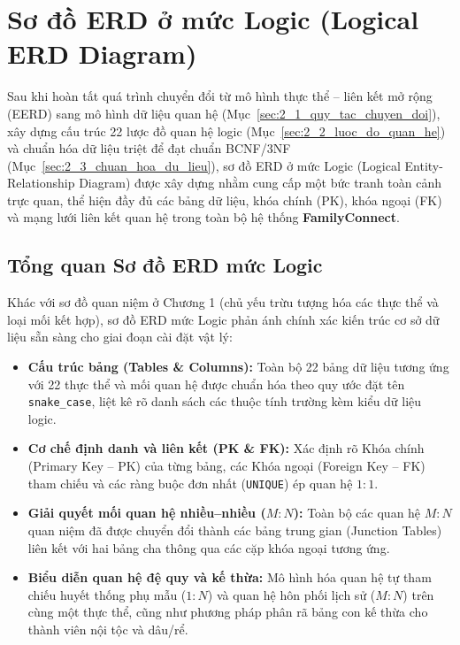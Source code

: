 \section{Sơ đồ ERD ở mức Logic (Logical ERD Diagram)}
\label{sec:2_4_so_do_erd_logic}

Sau khi hoàn tất quá trình chuyển đổi từ mô hình thực thể -- liên kết mở rộng (EERD) sang mô hình dữ liệu quan hệ (Mục~\ref{sec:2_1_quy_tac_chuyen_doi}), xây dựng cấu trúc 22 lược đồ quan hệ logic (Mục~\ref{sec:2_2_luoc_do_quan_he}) và chuẩn hóa dữ liệu triệt để đạt chuẩn BCNF/3NF (Mục~\ref{sec:2_3_chuan_hoa_du_lieu}), sơ đồ ERD ở mức Logic (Logical Entity-Relationship Diagram) được xây dựng nhằm cung cấp một bức tranh toàn cảnh trực quan, thể hiện đầy đủ các bảng dữ liệu, khóa chính (PK), khóa ngoại (FK) và mạng lưới liên kết quan hệ trong toàn bộ hệ thống \textbf{FamilyConnect}.

\subsection{Tổng quan Sơ đồ ERD mức Logic}

Khác với sơ đồ quan niệm ở Chương 1 (chủ yếu trừu tượng hóa các thực thể và loại mối kết hợp), sơ đồ ERD mức Logic phản ánh chính xác kiến trúc cơ sở dữ liệu sẵn sàng cho giai đoạn cài đặt vật lý:
\begin{itemize}
    \item \textbf{Cấu trúc bảng (Tables \& Columns):} Toàn bộ 22 bảng dữ liệu tương ứng với 22 thực thể và mối quan hệ được chuẩn hóa theo quy ước đặt tên \texttt{snake\_case}, liệt kê rõ danh sách các thuộc tính trường kèm kiểu dữ liệu logic.
    \item \textbf{Cơ chế định danh và liên kết (PK \& FK):} Xác định rõ Khóa chính (Primary Key -- PK) của từng bảng, các Khóa ngoại (Foreign Key -- FK) tham chiếu và các ràng buộc đơn nhất (\texttt{UNIQUE}) ép quan hệ $1:1$.
    \item \textbf{Giải quyết mối quan hệ nhiều--nhiều ($M:N$):} Toàn bộ các quan hệ $M:N$ quan niệm đã được chuyển đổi thành các bảng trung gian (Junction Tables) liên kết với hai bảng cha thông qua các cặp khóa ngoại tương ứng.
    \item \textbf{Biểu diễn quan hệ đệ quy và kế thừa:} Mô hình hóa quan hệ tự tham chiếu huyết thống phụ mẫu ($1:N$) và quan hệ hôn phối lịch sử ($M:N$) trên cùng một thực thể, cũng như phương pháp phân rã bảng con kế thừa cho thành viên nội tộc và dâu/rể.
\end{itemize}

